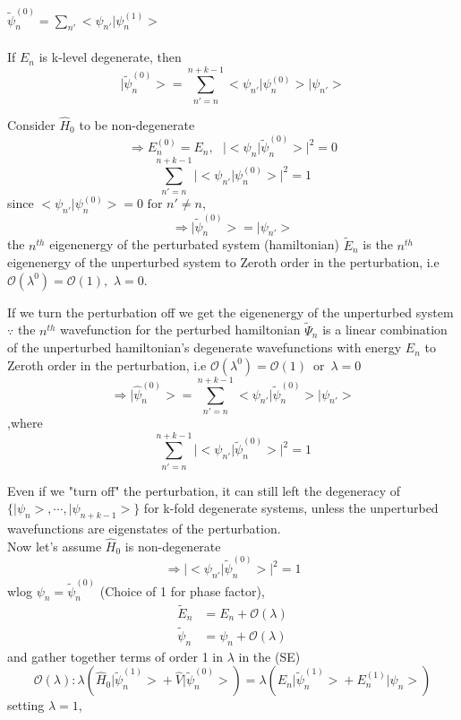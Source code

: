 \documentclass[12pt]{article}
\begin{document}
$\tilde{\psi}_n^{(0)} = \sum_{n'} \big< \psi_{n'} \big| \psi_n^{(1)} \big> $
\\
\\
If $E_n$ is k-level degenerate, then
\begin{equation}
	\big| \tilde{\psi}^{(0)}_n \big> = \sum_{n'=n}^{n+k-1} \big< \psi_{n'} \big| \psi_n^{(0)} \big>
	\big|\psi_{n'} \big>
\end{equation}

Consider $\hat{H}_0$ to be non-degenerate 
$$
	\Longrightarrow E^{(0)}_n = E_n,\,\,\,\,\big|\big< \psi_n | \tilde{\psi}^{(0)}_n \big> \big| ^2 = 0
$$
$$\sum_{n'=n}^{n+k-1}\big| \big< \psi_{n'} \big| \psi_n^{(0)} \big> \big|^2 = 1$$
since $ \big< \psi_{n'} \big| \psi_n^{(0)} \big> = 0\,\,\text{for }n'\neq n$,
$$\Longrightarrow \big| \tilde{\psi}^{(0)}_n \big > = \big| \psi_{n'} \big>$$
the $n^{th}$ eigenenergy of the perturbated system (hamiltonian) $\tilde{E}_n$ is the $n^{th}$ 
eigenenergy of the unperturbed system to Zeroth order in the perturbation, i.e $\mathcal{O}(\lambda^0)
= \mathcal{O}(1),\,\,\lambda = 0 $.

If we turn the perturbation off we get the eigenenergy of the unperturbed system
$\because$ the $n^{th}$ wavefunction for the perturbed hamiltonian $\tilde{\Psi}_n$ is a linear 
combination of the unperturbed hamiltonian's degenerate wavefunctions with energy $E_n$ to Zeroth
order in the perturbation, i.e $\mathcal{O}(\lambda^0) = \mathcal{O}(1)\,\,\,\text{or}\,\,\,\lambda = 0$ 
\begin{equation*}
	\Longrightarrow \big|\hat{\psi}^{(0)}_n \big> =\sum_{n'=n}^{n+k-1}
	\big< \psi_{n'} \big|\tilde{ \psi}_n^{(0)} \big> \big|\psi_{n'}\big>
\end{equation*}
,where
$$\sum_{n'=n}^{n+k-1}\big| \big< \psi_{n'} \big| \tilde{\psi}_n^{(0)} \big> \big|^2 = 1$$

Even if we "turn off" the perturbation, it can still left the degeneracy of $\{\big|\psi_n\big>,
\cdots, \big|\psi_{n+k-1}\big>\}$ for k-fold degenerate systems, unless the unperturbed wavefunctions
are eigenstates of the perturbation.\\

Now let's assume $\hat{H}_0$ is non-degenerate
$$\Longrightarrow \big| \big< \psi_{n'} \big| \tilde{\psi}_n^{(0)} \big> \big|^2 = 1$$
wlog $\psi_n = \tilde{\psi}^{(0)}_n$ (Choice of 1 for phase factor),
\begin{align*}
	\tilde{E}_n & = E_n + \mathcal{O}(\lambda)\\
	\tilde{\psi}_n & = \psi_n + \mathcal{O}(\lambda)
\end{align*}
and gather together terms of order 1 in $\lambda$ in the (SE)
\begin{equation}
	\mathcal{O}(\lambda):\lambda \left( \hat{H}_0 \big|\tilde{\psi}^{(1)}_n \big> + 
	\hat{V}\big| \tilde{\psi}^{(0)}_n\big> \right) = 
	\lambda \left(E_n \big|\tilde{\psi}^{(1)}_n \big> + E^{(1)}_n \big|\psi_n \big> \right)
\end{equation}
setting $\lambda = 1$,
\end{document}
